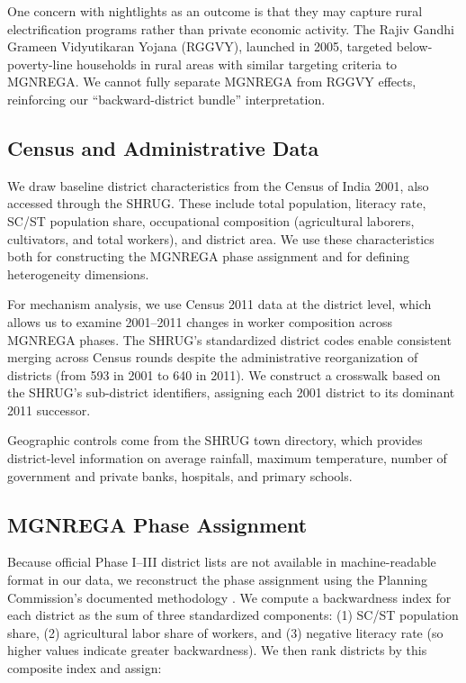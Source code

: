 \documentclass[12pt]{article}
\begin{document}
One concern with nightlights as an outcome is that they may capture rural electrification programs rather than private economic activity. The Rajiv Gandhi Grameen Vidyutikaran Yojana (RGGVY), launched in 2005, targeted below-poverty-line households in rural areas with similar targeting criteria to MGNREGA. We cannot fully separate MGNREGA from RGGVY effects, reinforcing our ``backward-district bundle'' interpretation.

\subsection{Census and Administrative Data}

We draw baseline district characteristics from the Census of India 2001, also accessed through the SHRUG. These include total population, literacy rate, SC/ST population share, occupational composition (agricultural laborers, cultivators, and total workers), and district area. We use these characteristics both for constructing the MGNREGA phase assignment and for defining heterogeneity dimensions.

For mechanism analysis, we use Census 2011 data at the district level, which allows us to examine 2001--2011 changes in worker composition across MGNREGA phases. The SHRUG's standardized district codes enable consistent merging across Census rounds despite the administrative reorganization of districts (from 593 in 2001 to 640 in 2011). We construct a crosswalk based on the SHRUG's sub-district identifiers, assigning each 2001 district to its dominant 2011 successor.

Geographic controls come from the SHRUG town directory, which provides district-level information on average rainfall, maximum temperature, number of government and private banks, hospitals, and primary schools.

\subsection{MGNREGA Phase Assignment}

Because official Phase I--III district lists are not available in machine-readable format in our data, we reconstruct the phase assignment using the Planning Commission's documented methodology \citep{planning_commission2003}. We compute a backwardness index for each district as the sum of three standardized components: (1) SC/ST population share, (2) agricultural labor share of workers, and (3) negative literacy rate (so higher values indicate greater backwardness). We then rank districts by this composite index and assign:
\end{document}

